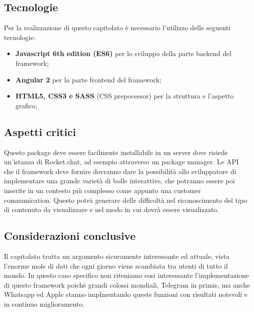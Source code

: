 \subsection{Tecnologie}

Per la realizzazione di questo capitolato è necessario l'utilizzo delle seguenti tecnologie:
\begin{itemize}
	\item \textbf{Javascript 6th edition (ES6)} per lo sviluppo della parte
	backend del framework;
	\item \textbf{Angular 2 }per la parte frontend del framework;
	\item \textbf{HTML5, CSS3 e SASS} (CSS prepocessor) per la struttura e l'aspetto
	grafico;
\end{itemize}

\subsection{Aspetti critici}

Questo package deve essere facilmente installabile in un server dove
risiede un'istanza di Rocket.chat, ad esempio attraverso un package
manager. Le API che il framework deve fornire dovranno dare la possibilità
allo sviluppatore di implementare una grande varietà di bolle interattive,
che potranno essere poi inserite in un contesto più complesso come
appunto una customer communication. Questo potrà generare delle difficoltà
nel riconoscimento del tipo di contenuto da visualizzare e nel modo
in cui dovrà essere visualizzato. 

\subsection{Considerazioni conclusive}

Il capitolato tratta un argomento sicuramente interessante ed attuale,
vista l'enorme mole di dati che ogni giorno viene scambiata tra utenti
di tutto il mondo. In questo caso specifico non riteniamo cosi interessante
l'implementazione di questo framework poichè grandi colossi mondiali,
Telegram in primis, ma anche Whatsapp ed Apple stanno implmentando
queste funzioni con risultati notevoli e in continuo miglioramento.

